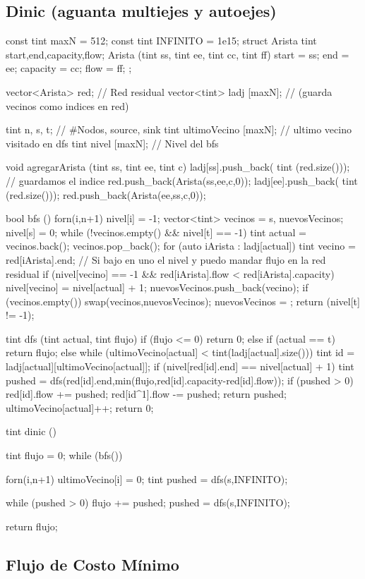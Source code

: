 \subsection{Dinic (aguanta multiejes y autoejes)}
\begin{code}
const tint maxN = 512;
const tint INFINITO = 1e15;
struct Arista {
	tint start,end,capacity,flow;
	Arista (tint ss, tint ee, tint cc, tint ff) {
		start = ss;
		end = ee;
		capacity = cc;
		flow = ff;
	}
};

vector<Arista>  red; // Red residual
vector<tint> ladj [maxN]; // (guarda vecinos como indices en red)

tint n, s, t; // #Nodos, source, sink
tint ultimoVecino [maxN]; // ultimo vecino visitado en dfs
tint nivel [maxN]; // Nivel del bfs

void agregarArista (tint ss, tint ee, tint c) {
	ladj[ss].push_back( tint (red.size())); // guardamos el indice
	red.push_back(Arista(ss,ee,c,0));
	ladj[ee].push_back( tint (red.size()));
	red.push_back(Arista(ee,ss,c,0));
}

bool bfs () {
	forn(i,n+1)
		nivel[i] = -1;
	vector<tint> vecinos = {s}, nuevosVecinos;
	nivel[s] = 0;
	while (!vecinos.empty() && nivel[t] == -1) {
		tint actual = vecinos.back();
		vecinos.pop_back();
		for (auto iArista : ladj[actual]) {
			tint vecino = red[iArista].end;
			// Si bajo en uno el nivel y puedo mandar flujo en la red residual
			if (nivel[vecino] == -1 && red[iArista].flow < red[iArista].capacity) {
				nivel[vecino] = nivel[actual] + 1;
				nuevosVecinos.push_back(vecino);
			}
		}
		if (vecinos.empty()) {
			swap(vecinos,nuevosVecinos);
			nuevosVecinos = {};
		}
	}
	return (nivel[t] != -1);
}

tint dfs (tint actual, tint flujo) {
	if (flujo <= 0)
		return 0;
	else if (actual == t)
		return flujo;
	else {
		while (ultimoVecino[actual] < tint(ladj[actual].size())) {
			tint id = ladj[actual][ultimoVecino[actual]];
			if (nivel[red[id].end] == nivel[actual] + 1) {
				tint pushed = dfs(red[id].end,min(flujo,red[id].capacity-red[id].flow));
				if (pushed > 0) {
					red[id].flow += pushed;
					red[id^1].flow -= pushed;
					return pushed;
				}
			}
			ultimoVecino[actual]++;
		}
		return 0;	
	}
}

tint dinic () {
	tint flujo = 0;
	while (bfs()) {
		forn(i,n+1)
			ultimoVecino[i] = 0;
		tint pushed = dfs(s,INFINITO);
		
		while (pushed > 0) {
			flujo += pushed;
			pushed = dfs(s,INFINITO);
		}
	}
	return flujo;
}
\end{code}

\subsection{Flujo de Costo Mínimo}
\begin{code}
\end{code}
